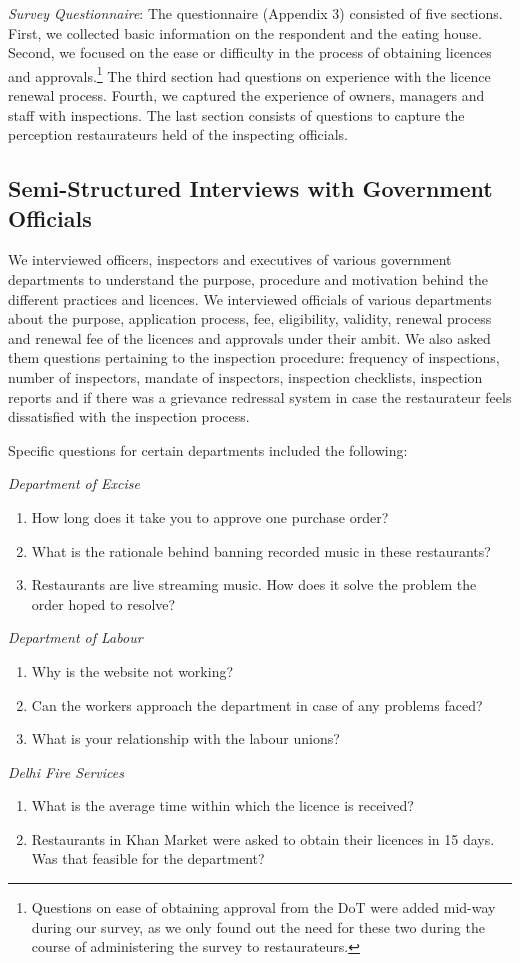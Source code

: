 \documentclass[a4paper, 12pt]{article}
\begin{document}
		\textit{Survey Questionnaire}: The questionnaire (Appendix 3) consisted of five sections. First, we collected basic information on the respondent and the eating house. Second, we focused on the ease or difficulty in the process of obtaining licences and approvals.\footnote{Questions on ease of obtaining approval from the DoT were added mid-way during our survey, as we only found out the need for these two during the course of administering the survey to restaurateurs.} The third section had questions on experience with the licence renewal process. Fourth, we captured the experience of owners, managers and staff with inspections. The last section consists of questions to capture the perception restaurateurs held of the inspecting officials.

		\subsection*{Semi-Structured Interviews with Government Officials}
		We interviewed officers, inspectors and executives of various government departments to understand the purpose, procedure and motivation behind the different practices and licences. We interviewed officials of various departments about the purpose, application process, fee, eligibility, validity, renewal process and renewal fee of the licences and approvals under their ambit. We also asked them questions pertaining to the inspection procedure: frequency of inspections, number of inspectors, mandate of inspectors, inspection checklists, inspection reports and if there was a grievance redressal system in case the restaurateur feels dissatisfied with the inspection process.
		
		Specific questions for certain departments included the following:
		
		\textit {Department of Excise}
			\begin {enumerate}[-,nosep]
			\item How long does it take you to approve one purchase order? 
			\item What is the rationale behind banning recorded music in these restaurants?
			\item Restaurants are live streaming music. How does it solve the problem the order hoped to resolve?
			\end {enumerate}
		\textit {Department of Labour}
			\begin {enumerate}[-,nosep]
			\item Why is the website not working? 
			\item Can the workers approach the department in case of any problems faced?
			\item What is your relationship with the labour unions?
			\end {enumerate}
		\textit {Delhi Fire Services}
		\begin {enumerate}[-,nosep]
		\item What is the average time within which the licence is received?
		\item Restaurants in Khan Market were asked to obtain their licences in 15 days. Was that feasible for the department?
		\end {enumerate}
\end{document}
